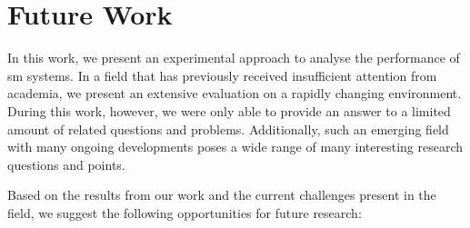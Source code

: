 \section{Future Work}
\label{sec:conclusion:future-work}

In this work, we present an experimental approach to analyse the performance of \gls{sm} systems. In a field that has previously received insufficient attention from academia, we present an extensive evaluation on a rapidly changing environment. During this work, however, we were only able to provide an answer to a limited amount of related questions and problems. Additionally, such an emerging field with many ongoing developments poses a wide range of many interesting research questions and points.

Based on the results from our work and the current challenges present in the field, we suggest the following opportunities for future research:


